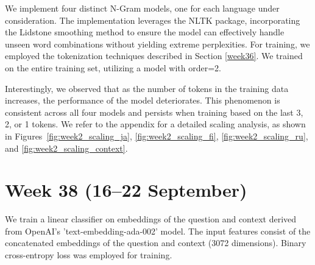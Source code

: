 \documentclass[11pt]{article}
\begin{document}
We implement four distinct N-Gram models, one for each language under consideration. 
The implementation leverages the NLTK package, incorporating the Lidstone smoothing method to ensure the model can effectively handle unseen word combinations without yielding extreme perplexities.
For training, we employed the tokenization techniques described in Section \ref{week36}. We trained on the entire training set, utilizing a model with order=2.

\begin{table}[ht]
    \centering
    \caption{Language Model Performance}
    \label{tab:language_model_performance}
\end{table}

Interestingly, we observed that as the number of tokens in the training data increases, the performance of the model deteriorates. 
This phenomenon is consistent across all four models and persists when training based on the last 3, 2, or 1 tokens. 
We refer to the appendix for a detailed scaling analysis, as shown in Figures~\ref{fig:week2_scaling_ja}, \ref{fig:week2_scaling_fi}, \ref{fig:week2_scaling_ru}, and \ref{fig:week2_scaling_context}.  

\section{Week 38 (16--22 September)}
\label{sec:week38}

We train a linear classifier on embeddings of the question and context derived from OpenAI's 'text-embedding-ada-002' model. 
The input features consist of the concatenated embeddings of the question and context (3072 dimensions). 
Binary cross-entropy loss was employed for training.
\end{document}
